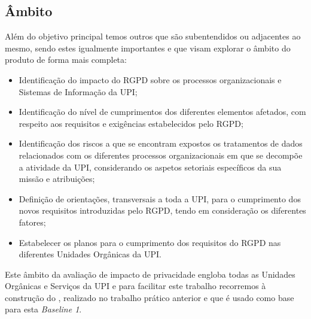 \subsection{Âmbito}
Além do objetivo principal temos outros que são subentendidos ou adjacentes ao mesmo, sendo estes igualmente importantes e que visam explorar o âmbito do produto de forma mais completa:

\begin{itemize}
    \item Identificação do impacto do RGPD sobre os processos organizacionais e Sistemas de Informação da UPI;
    \item Identificação do nível de cumprimentos dos diferentes elementos afetados, com respeito aos requisitos e exigências estabelecidos pelo RGPD;
    \item Identificação dos riscos a que se encontram expostos os tratamentos de dados relacionados com os diferentes processos organizacionais em que se decompõe a atividade da UPI, considerando os aspetos setoriais específicos da sua missão e atribuições;
    \item Definição de orientações, transversais a toda a UPI, para o cumprimento dos novos requisitos introduzidas pelo RGPD, tendo em consideração os diferentes fatores;
    \item Estabelecer os planos para o cumprimento dos requisitos do RGPD nas diferentes Unidades Orgânicas da UPI.
\end{itemize}


Este âmbito da avaliação de impacto de privacidade engloba todas as Unidades Orgânicas e Serviços da UPI e para facilitar este trabalho recorremos à construção do , realizado no trabalho prático anterior e que é usado como base para esta \emph{Baseline 1}.

